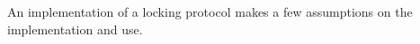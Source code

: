 


    

An implementation of a locking protocol makes a few assumptions on the implementation and use.

